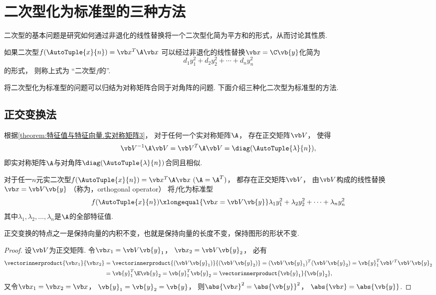 \section{二次型化为标准型的三种方法}
二次型的基本问题是研究如何通过非退化的线性替换将一个二次型化简为平方和的形式，从而讨论其性质.

\begin{definition}
如果二次型\(f(\AutoTuple{x}{n})=\x^T\A\x\)
可以经过非退化的线性替换\(\x = \C \vb{y}\)化简为\[
	d_1 y_1^2 + d_2 y_2^2 + \dotsb + d_n y_n^2
\]的形式，
则称上式为
“二次型\(f\)的”.
\end{definition}
将二次型化为标准型的问题可以归结为对称矩阵合同于对角阵的问题.
下面介绍三种化二次型为标准型的方法.

\subsection{正交变换法}
根据\cref{theorem:特征值与特征向量.实对称矩阵3}，
对于任何一个实对称矩阵\(\A\)，
存在正交矩阵\(\Q\)，
使得\[
	\Q^{-1}\A\Q = \Q^T\A\Q = \diag(\AutoTuple{\lambda}{n}),
\]
即实对称矩阵\(\A\)与对角阵\(\diag(\AutoTuple{\lambda}{n})\)合同且相似.

\begin{theorem}
对于任一\(n\)元实二次型\(f(\AutoTuple{x}{n})=\x^T\A\x\ (\A=\A^T)\)，
都存在正交矩阵\(\Q\)，
由\(\Q\)构成的线性替换\(\x=\Q\vb{y}\)
（称为，{\rm orthogonal operator}）
将\(f\)化为标准型\[
	f(\AutoTuple{x}{n})
	\xlongequal{\x=\Q\vb{y}}
	\lambda_1y_1^2+\lambda_2y_2^2+ \dotsb +\lambda_ny_n^2
\]
其中\(\lambda_1,\lambda_2,\dotsc,\lambda_n\)是\(\A\)的全部特征值.
\end{theorem}

\begin{corollary}
正交变换的特点之一是保持向量的内积不变，也就是保持向量的长度不变，保持图形的形状不变.
\begin{proof}
设\(\Q\)为正交矩阵.
令\(\x_1=\Q\vb{y}_1\)，
\(\x_2=\Q\vb{y}_2\)，
必有\begin{align*}
	\vectorinnerproduct{\x_1}{\x_2}
	&=\vectorinnerproduct{(\Q\vb{y}_1)}{(\Q\vb{y}_2)}
	=(\Q\vb{y}_1)^T (\Q\vb{y}_2)
	=\vb{y}_1^T \Q^T \Q \vb{y}_2 \\
	&=\vb{y}_1^T \E \vb{y}_2
	=\vb{y}_1^T \vb{y}_2
	=\vectorinnerproduct{\vb{y}_1}{\vb{y}_2},
\end{align*}
又令\(\x_1=\x_2=\x\)，
\(\vb{y}_1=\vb{y}_2=\vb{y}\)，
则\(\abs{\x}^2=\abs{\vb{y}}^2\)，
\(\abs{\x}=\abs{\vb{y}}\).
\end{proof}
\end{corollary}

